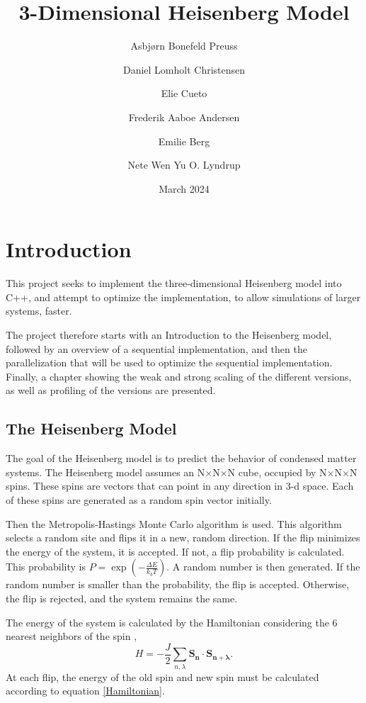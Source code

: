 \documentclass{article}
\title{3-Dimensional Heisenberg Model}
\author{Asbjørn Bonefeld Preuss \and Daniel Lomholt Christensen \and Elie Cueto \and Frederik Aaboe Andersen \and Emilie Berg \and Nete Wen Yu O. Lyndrup}
\date{March 2024}
\begin{document}
\maketitle

\section{Introduction}
This project seeks to implement the three-dimensional Heisenberg model into C++, and attempt to optimize the implementation, to allow simulations of larger systems, faster.

The project therefore starts with an Introduction to the Heisenberg model, followed by an overview of a sequential implementation, and then the parallelization that will be used to optimize the sequential implementation. Finally, a chapter showing the weak and strong scaling of the different versions, as well as profiling of the versions are presented.

\subsection{The Heisenberg Model}
The goal of the Heisenberg model is to predict the behavior of condensed matter systems.
The Heisenberg model assumes an N$\times$N$\times$N cube, occupied by N$\times$N$\times$N spins. These spins are vectors that can point in any direction in 3-d space. Each of these spins are generated as a random spin vector initially. 

Then the Metropolis-Hastings Monte Carlo algorithm is used. This algorithm selects a random site and flips it in a new, random direction. If the flip minimizes the energy of the system, it is accepted. If not, a flip probability is calculated. This probability is $P=\exp\left(-\frac{\Delta E}{k_bT}\right)$. %
A random number is then generated. If the random number is smaller than the probability, the flip is accepted. Otherwise, the flip is rejected, and the system remains the same.

The energy of the system is calculated by the Hamiltonian considering the 6 nearest neighbors of the spin \cite{Heisenberg},
\begin{equation}
    H = - \frac{J}{2}\sum_{n, \lambda}\mathbf{S_n}\cdot\mathbf{S_{n + \lambda}}.
    \label{Hamiltonian}
\end{equation}
At each flip, the energy of the old spin and new spin must be calculated according to equation \ref{Hamiltonian}. 
\end{document}
